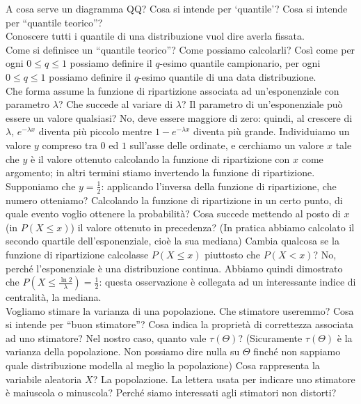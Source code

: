\documentclass{article}
\begin{document}
    A cosa serve un diagramma QQ? Cosa si intende per ‘quantile’? Cosa si intende per “quantile teorico”? \\
    Conoscere tutti i quantile di una distribuzione vuol dire averla fissata. \\
    Come si definisce un “quantile teorico”? Come possiamo calcolarli? Così come per ogni $ 0 \leq q \leq 1 $ possiamo definire il $ q $-esimo quantile campionario, per ogni
    $ 0 \leq q \leq 1 $ possiamo definire il $ q $-esimo quantile di una data distribuzione. \\
    Che forma assume la funzione di ripartizione associata ad un'esponenziale con parametro $ \lambda $? Che succede al variare di $ \lambda $? Il parametro di un'esponenziale
    può essere un valore qualsiasi? No, deve essere maggiore di zero: quindi, al crescere di $ \lambda $, $ e^{ - \lambda x } $ diventa più piccolo mentre
    $ 1 - e^{ - \lambda x } $ diventa più grande. Individuiamo un valore $ y $ compreso tra $ 0 $ ed $ 1 $ sull'asse delle ordinate, e cerchiamo un valore $ x $ tale che $ y $
    è il valore ottenuto calcolando la funzione di ripartizione con $ x $ come argomento; in altri termini stiamo invertendo la funzione di ripartizione. Supponiamo che
    $ y = \frac{ 1 }{ 2 } $: applicando l'inversa della funzione di ripartizione, che numero otteniamo? Calcolando la funzione di ripartizione in un certo punto, di quale evento
    voglio ottenere la probabilità? Cosa succede mettendo al posto di $ x $ (in $ P ( X \leq x ) $) il valore ottenuto in precedenza? (In pratica abbiamo calcolato il secondo quartile
    dell'esponenziale, cioè la sua mediana) Cambia qualcosa se la funzione di ripartizione calcolasse $ P ( X \leq x ) $ piuttosto che $ P ( X < x ) $? No, perché l'esponenziale è una
    distribuzione continua. Abbiamo quindi dimostrato che $ P \left ( X \leq \frac{ \ln 2 }{ \lambda } \right ) = \frac{ 1 }{ 2 } $: questa osservazione è collegata ad un interessante
    indice di centralità, la mediana. \\
    Vogliamo stimare la varianza di una popolazione. Che stimatore useremmo? Cosa si intende per “buon stimatore”? Cosa indica la proprietà di correttezza associata ad uno
    stimatore? Nel nostro caso, quanto vale $ \tau ( \Theta ) $? (Sicuramente $ \tau ( \Theta ) $ è la varianza della popolazione. Non possiamo dire nulla su $ \Theta $ finché non
    sappiamo quale distribuzione modella al meglio la popolazione) Cosa rappresenta la variabile aleatoria $ X $? La popolazione. La lettera usata per indicare uno stimatore è 
    maiuscola o minuscola? Perché siamo interessati agli stimatori non distorti? \\
    
\end{document}
